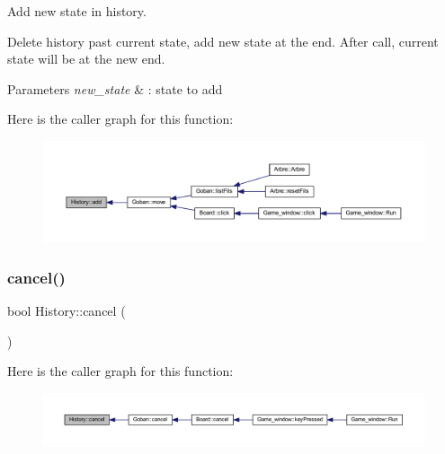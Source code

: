 Add new state in history. 

Delete history past current state, add new state at the end. After call, current state will be at the new end.


\begin{DoxyParams}{Parameters}
{\em new\+\_\+state} & \+: state to add \\
\hline
\end{DoxyParams}
Here is the caller graph for this function\+:
\nopagebreak
\begin{figure}[H]
\begin{center}
\leavevmode
\includegraphics[width=350pt]{class_history_a90222df7f73ae9cfda56bdb66cb1985e_icgraph}
\end{center}
\end{figure}
\mbox{\label{class_history_a6e1bcaa1d3ecc646131e6f73a2544f35}} 
\subsubsection{\texorpdfstring{cancel()}{cancel()}}
{\footnotesize\ttfamily bool History\+::cancel (\begin{DoxyParamCaption}{ }\end{DoxyParamCaption})}

Here is the caller graph for this function\+:
\nopagebreak
\begin{figure}[H]
\begin{center}
\leavevmode
\includegraphics[width=350pt]{class_history_a6e1bcaa1d3ecc646131e6f73a2544f35_icgraph}
\end{center}
\end{figure}
\mbox{\label{class_history_a8ef13fdf00ec0786268fd6bd211bf38f}} 

